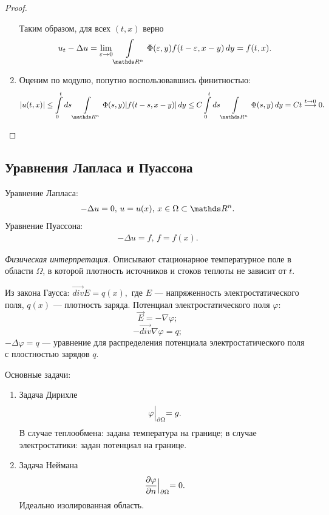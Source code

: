 \begin{proof}
\begin{enumerate}
Таким образом, для всех $(t,x)$ верно
$$ u_t - \Delta u = \lim_{\eps \to 0} \int \limits_{\real^n} \Phi(\eps, y) f(t-\eps, x-y) \, dy = f(t,x).$$

\item Оценим по модулю, попутно воспользовавшись финитностью:
$$\abs{u(t,x)} \leq \int \limits_0^t ds \int \limits_{\real^n} \Phi(s,y) |f(t-s, x-y)| \,dy \leq C \int \limits_0^t ds \int \limits_{\real^n} \Phi(s,y) \, dy = Ct \stackrel{t \to 0} \longrightarrow 0. $$
\end{enumerate}

\end{proof}

\subsection{Уравнения Лапласа и Пуассона}

Уравнение Лапласа: \begin{align}-\Delta u = 0, \, u = u(x), \, x \in \Omega \subset \real^n.\label{Laplace}\end{align}
Уравнение Пуассона: \begin{align}-\Delta u = f, \, f = f(x).\label{Poisson}\end{align}

{\itshape Физическая интерпретация.} Описывают стационарное температурное поле в области $\Omega$, в которой плотность источников и стоков теплоты не зависит от $t$.

Из закона Гаусса: $\overrightarrow{div}E = q(x),$ где $E$ --- напряженность электростатического поля, $q(x)$ --- плотность заряда.
Потенциал электростатического поля $\varphi:$
$$\stackrel{\rightarrow} E = -\nabla \varphi;$$
$$-\overrightarrow{div}\nabla\varphi = q;$$
$-\Delta \varphi = q$  --- уравнение для распределения потенциала электростатического поля с плостностью зарядов $ q.$

Основные задачи:
\begin{enumerate}
\item Задача Дирихле
$$\varphi \Bigl|_{\partial\Omega} = g.$$
В случае теплообмена: задана температура на границе; в случае электростатики: задан потенциал на границе.
\item Задача Неймана
$$\dfrac{\partial\varphi}{\partial n}\Bigl|_{\partial\Omega}=0.$$
Идеально изолированная область.
\end{enumerate}
